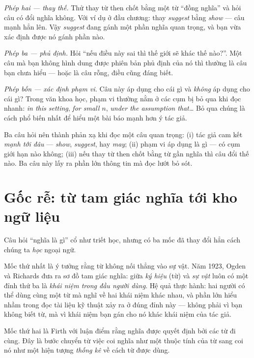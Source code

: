 \documentclass[../../english.tex]{subfiles}
\begin{document}
\emph{Phép hai --- thay thế.} Thử thay từ then chốt bằng một từ ``đồng nghĩa'' và hỏi câu có đổi nghĩa không. Với ví dụ ở đầu chương: thay \emph{suggest} bằng \emph{show} --- câu mạnh hẳn lên. Vậy \emph{suggest} đang gánh một phần nghĩa quan trọng, và bạn vừa xác định được nó gánh phần nào.

\emph{Phép ba --- phủ định.} Hỏi ``nếu điều này sai thì thế giới sẽ khác thế nào?''. Một câu mà bạn không hình dung được phiên bản phủ định của nó thì thường là câu bạn chưa hiểu --- hoặc là câu rỗng, điều cũng đáng biết.

\emph{Phép bốn --- xác định phạm vi.} Câu này áp dụng cho cái gì và \emph{không} áp dụng cho cái gì? Trong văn khoa học, phạm vi thường nằm ở các cụm bị bỏ qua khi đọc nhanh: \emph{in this setting}, \emph{for small \(n\)}, \emph{under the assumption that\ldots} Bỏ qua chúng là cách phổ biến nhất để hiểu một bài báo mạnh hơn ý tác giả.

\begin{cannho}
Ba câu hỏi nên thành phản xạ khi đọc một câu quan trọng: (i) tác giả cam kết \emph{mạnh tới đâu} --- \emph{show}, \emph{suggest}, hay \emph{may}; (ii) phạm vi áp dụng là gì --- có cụm giới hạn nào không; (iii) nếu thay từ then chốt bằng từ gần nghĩa thì câu đổi thế nào. Ba câu này lấy ra phần lớn thông tin mà đọc lướt bỏ sót.
\end{cannho}

\section{Gốc rễ: từ tam giác nghĩa tới kho ngữ liệu}

Câu hỏi ``nghĩa là gì'' cổ như triết học, nhưng có ba mốc đã thay đổi hẳn cách chúng ta \emph{học} ngoại ngữ.

Mốc thứ nhất là ý tưởng rằng từ không nối thẳng vào sự vật. Năm 1923, Ogden và Richards đưa ra sơ đồ tam giác nghĩa: giữa \emph{ký hiệu} (từ) và \emph{sự vật} luôn có một đỉnh thứ ba là \emph{khái niệm trong đầu người dùng}\cite{ogden1923}. Hệ quả thực hành: hai người có thể dùng cùng một từ mà nghĩ về hai khái niệm khác nhau, và phần lớn hiểu nhầm trong đọc tài liệu kỹ thuật xảy ra ở đúng đỉnh này --- không phải vì bạn không biết từ, mà vì khái niệm bạn gán cho nó khác khái niệm của tác giả.

Mốc thứ hai là Firth với luận điểm rằng nghĩa được quyết định bởi các từ đi cùng\cite{firth1957}. Đây là bước chuyển từ việc coi nghĩa như một thuộc tính của từ sang coi nó như một hiện tượng \emph{thống kê} về cách từ được dùng.
\end{document}
